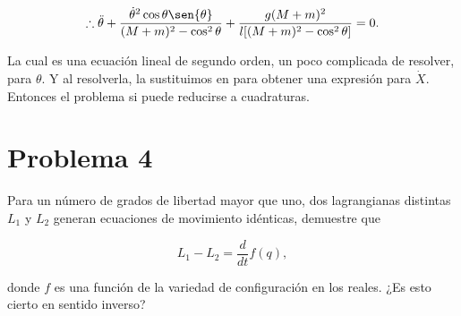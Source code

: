 \documentclass[a4paper,10pt]{article}
\numberwithin{equation}{section}
\begin{document}
\begin{equation}
 \therefore \ddot{\theta} + \frac{\dot{\theta}^2\cos{\theta}\sen{\theta}}{(M+m)^2 - \cos^2{\theta}} 
  + \frac{g(M+m)^2}{l[(M+m)^2-\cos^2{\theta}]} = 0.
\end{equation}

La cual es una ecuación lineal de segundo orden, un poco complicada de resolver, 
para $\theta$. Y al resolverla, la sustituimos en  para obtener 
una expresión para $\dot{X}$. Entonces el problema si puede reducirse a cuadraturas.
 
% 
% 
% 






\section{Problema 4}

Para un número de grados de libertad mayor que uno, dos lagrangianas distintas $L_1$
y $L_2$ generan ecuaciones de movimiento idénticas, demuestre que 

$$
L_1 - L_2 = \frac{d}{dt}f(q),
$$

donde $f$ es una función de la variedad de configuración en los reales. ¿Es esto cierto 
en sentido inverso?
\end{document}
